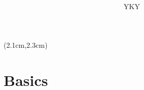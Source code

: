 \newcommand{\logic}[1]{{\color{violet}{\textit{#1}}}}
\newcommand{\underconst}{\texttt{[image: ../2020/UnderConst.png]}}
\newcommand{\KBsymbol}{\vcenter{\hbox{\texttt{[image: ../KB-symbol.png]}}}}
\newcommand{\token}{\vcenter{\hbox{\texttt{[image: token.png]}}}}
\newcommand{\proposition}{\vcenter{\hbox{\texttt{[image: proposition.png]}}}}

\setcounter{secnumdepth}{2}		%


	
\begin{preview}

\title{\vspace{-1.5cm} \bfseries\color{blue}{\LARGE AGI from the perspective of categorical logic and geometry}}

\author{YKY} %

\maketitle

\setcounter{section}{-1}
\setcounter{mypage}{0}

\begin{textblock*}{5cm}(2.1cm,2.3cm) %
	{\color{red}{\large \textcircled{\small \themypage}}}
	\addtocounter{mypage}{1}
\end{textblock*}

\begin{minipage}{\textwidth}
	\setlength{\parskip}{0.4\baselineskip}
			
\section{Basics}


\end{minipage}
\end{preview}
